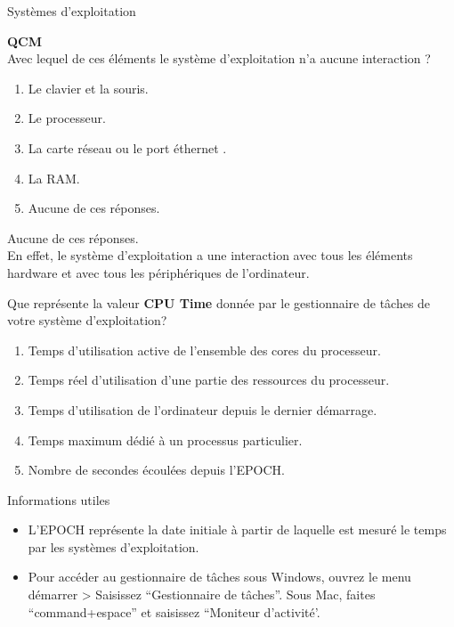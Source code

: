 \begin{section}{Systèmes d'exploitation}
    \begin{Exercice}[5 minutes]  \textbf{QCM}\\
    Avec lequel de ces éléments le système d'exploitation n'a aucune interaction ?
        \begin{enumerate}
            \item Le clavier et la souris.
            \item Le processeur.
            \item La carte réseau ou le port éthernet .
            \item La RAM.
            \item Aucune de ces réponses.
        \end{enumerate}
    \end{Exercice}
    \begin{solution}
            Aucune de ces réponses. \\
	    
	    En effet, le système d'exploitation a une interaction avec tous les éléments hardware et avec tous les périphériques de l'ordinateur. \\
    \end{solution}

    \begin{Exercice}[5 minutes]
        Que représente la valeur \textbf{CPU Time} donnée par le gestionnaire de tâches de votre système d'exploitation?
        \begin{enumerate}
            \item Temps d'utilisation active de l'ensemble des cores du processeur.
            \item Temps réel d'utilisation d'une partie des ressources du processeur.
            \item Temps d'utilisation de l'ordinateur depuis le dernier démarrage.
            \item Temps maximum dédié à un processus particulier.
            \item Nombre de secondes écoulées depuis l'EPOCH.
        \end{enumerate}
        \begin{Example}{\faLightbulb \quad Informations utiles}
            \begin{itemize}
                \item L'EPOCH représente la date initiale à partir de laquelle est mesuré le temps par les systèmes d'exploitation.
                \item Pour accéder au gestionnaire de tâches sous Windows, ouvrez le menu démarrer > Saisissez ``Gestionnaire de tâches''. Sous Mac, faites ``command+espace'' et saisissez ``Moniteur d'activité'.
            \end{itemize}
            

\end{Example}
\end{Exercice}
\end{section}
